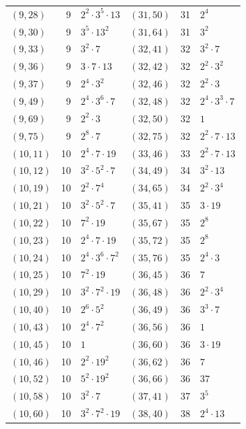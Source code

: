 \documentclass[11pt]{article}
\begin{document}
\begin{longtable}{@{}lrl@{\qquad}lrl@{}}
$(9,28)$ & 9 & $2^{2}\cdot 3^{5}\cdot 13$ & $(31,50)$ & 31 & $2^{4}$\\
$(9,30)$ & 9 & $3^{5}\cdot 13^{2}$ & $(31,64)$ & 31 & $3^{2}$\\
$(9,33)$ & 9 & $3^{2}\cdot 7$ & $(32,41)$ & 32 & $3^{2}\cdot 7$\\
$(9,36)$ & 9 & $3\cdot 7\cdot 13$ & $(32,42)$ & 32 & $2^{2}\cdot 3^{2}$\\
$(9,37)$ & 9 & $2^{4}\cdot 3^{2}$ & $(32,46)$ & 32 & $2^{2}\cdot 3$\\
$(9,49)$ & 9 & $2^{4}\cdot 3^{6}\cdot 7$ & $(32,48)$ & 32 & $2^{4}\cdot 3^{3}\cdot 7$\\
$(9,69)$ & 9 & $2^{2}\cdot 3$ & $(32,50)$ & 32 & $1$\\
$(9,75)$ & 9 & $2^{8}\cdot 7$ & $(32,75)$ & 32 & $2^{2}\cdot 7\cdot 13$\\
$(10,11)$ & 10 & $2^{4}\cdot 7\cdot 19$ & $(33,46)$ & 33 & $2^{2}\cdot 7\cdot 13$\\
$(10,12)$ & 10 & $3^{2}\cdot 5^{2}\cdot 7$ & $(34,49)$ & 34 & $3^{2}\cdot 13$\\
$(10,19)$ & 10 & $2^{2}\cdot 7^{4}$ & $(34,65)$ & 34 & $2^{2}\cdot 3^{4}$\\
$(10,21)$ & 10 & $3^{2}\cdot 5^{2}\cdot 7$ & $(35,41)$ & 35 & $3\cdot 19$\\
$(10,22)$ & 10 & $7^{2}\cdot 19$ & $(35,67)$ & 35 & $2^{8}$\\
$(10,23)$ & 10 & $2^{4}\cdot 7\cdot 19$ & $(35,72)$ & 35 & $2^{8}$\\
$(10,24)$ & 10 & $2^{4}\cdot 3^{6}\cdot 7^{2}$ & $(35,76)$ & 35 & $2^{4}\cdot 3$\\
$(10,25)$ & 10 & $7^{2}\cdot 19$ & $(36,45)$ & 36 & $7$\\
$(10,29)$ & 10 & $3^{2}\cdot 7^{2}\cdot 19$ & $(36,48)$ & 36 & $2^{2}\cdot 3^{4}$\\
$(10,40)$ & 10 & $2^{6}\cdot 5^{2}$ & $(36,49)$ & 36 & $3^{3}\cdot 7$\\
$(10,43)$ & 10 & $2^{4}\cdot 7^{2}$ & $(36,56)$ & 36 & $1$\\
$(10,45)$ & 10 & $1$ & $(36,60)$ & 36 & $3\cdot 19$\\
$(10,46)$ & 10 & $2^{2}\cdot 19^{2}$ & $(36,62)$ & 36 & $7$\\
$(10,52)$ & 10 & $5^{2}\cdot 19^{2}$ & $(36,66)$ & 36 & $37$\\
$(10,58)$ & 10 & $3^{2}\cdot 7$ & $(37,41)$ & 37 & $3^{5}$\\
$(10,60)$ & 10 & $3^{2}\cdot 7^{2}\cdot 19$ & $(38,40)$ & 38 & $2^{4}\cdot 13$\\

\end{longtable}
\end{document}
